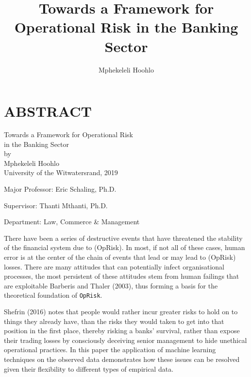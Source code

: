 \documentclass[]{DissertateUSU}
\title{Towards a Framework for Operational Risk in the Banking Sector}
\author{Mphekeleli Hoohlo}
\date{}
\begin{document}
\maketitle

 \pagestyle{empty} \copyrightpage

\newpage

\pagestyle{fancy}  \fancyhead[R]{\thepage}
\fancyfoot[C]{} \chapter*{ABSTRACT}

\doublespacing

\begin{center}
Towards a Framework for Operational Risk \\ 
in the Banking Sector \\
\vspace{12pt}
by \\
\vspace{12pt}
Mphekeleli Hoohlo \\
University of the Witwatersrand, 2019
\end{center}

\vspace{12pt}

\singlespacing
\noindent Major Professor: Eric Schaling, Ph.D.

\noindent Supervisor: Thanti Mthanti, Ph.D.

\noindent Department: Law, Commerce \& Management

\vspace{12pt}

\doublespacing

There have been a series of destructive events that have threatened the
stability of the financial system due to (OpRisk). In most, if not all
of these cases, human error is at the center of the chain of events that
lead or may lead to (OpRisk) losses. There are many attitudes that can
potentially infect organisational processes, the most persistent of
these attitudes stem from human failings that are exploitable Barberis
and Thaler (2003), thus forming a basis for the theoretical foundation
of \texttt{OpRisk}.

Shefrin (2016) notes that people would rather incur greater risks to
hold on to things they already have, than the risks they would taken to
get into that position in the first place, thereby risking a banks'
survival, rather than expose their trading losses by consciously
deceiving senior management to hide unethical operational practices. In
this paper the application of machine learning techniques on the
observed data demonstrates how these issues can be resolved given their
flexibility to different types of empirical data.
\end{document}
